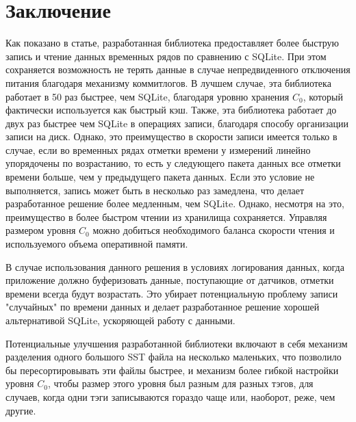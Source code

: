 \section{Заключение}

Как показано в статье, разработанная библиотека предоставляет более быструю запись и чтение данных временных рядов по сравнению с SQLite. При этом сохраняется возможность не терять данные в случае непредвиденного отключения питания благодаря механизму коммитлогов. В лучшем случае, эта библиотека работает в 50 раз быстрее, чем SQLite, благодаря уровню хранения $C_0$, который фактически используется как быстрый кэш. Также, эта библиотека работает до двух раз быстрее чем SQLite в операциях записи, благодаря способу организации записи на диск. Однако, это преимущество в скорости записи имеется только в случае, если во временных рядах отметки времени у измерений линейно упорядочены по возрастанию, то есть у следующего пакета данных все отметки времени больше, чем у предыдущего пакета данных. Если это условие не выполняется, запись может быть в несколько раз замедлена, что делает разработанное решение более медленным, чем SQLite. Однако, несмотря на это, преимущество в более быстром чтении из хранилища сохраняется. Управляя размером уровня $C_0$ можно добиться необходимого баланса скорости чтения и используемого объема оперативной памяти.

В случае использования данного решения в условиях логирования данных, когда приложение должно буферизовать данные, поступающие от датчиков, отметки времени всегда будут возрастать. Это убирает потенциальную проблему записи "случайных" по времени данных и делает разработанное решение хорошей альтернативой SQLite, ускоряющей работу с данными.

Потенциальные улучшения разработанной библиотеки включают в себя механизм разделения одного большого SST файла на несколько маленьких, что позволило бы пересортировывать эти файлы быстрее, и механизм более гибкой настройки уровня $C_0$, чтобы размер этого уровня был разным для разных тэгов, для случаев, когда одни тэги записываются гораздо чаще или, наоборот, реже, чем другие.